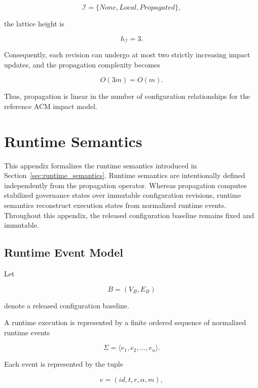 \documentclass[10pt]{article}
\begin{document}
\[
\mathcal I
=
\{
None,
Local,
Propagated
\},
\]

the lattice height is

\[
h_{\mathcal I}=3.
\]

Consequently, each revision can undergo at most two strictly increasing impact
updates, and the propagation complexity becomes

\begin{equation}
	\label{eq:worklist_complexity_acm}
	O(3m)
	=
	O(m).
\end{equation}

Thus, propagation is linear in the number of configuration relationships for
the reference ACM impact model.

\section{Runtime Semantics}
\label{appendix:runtime_semantics}

This appendix formalizes the runtime semantics introduced in
Section~\ref{sec:runtime_semantics}. Runtime semantics are intentionally
defined independently from the propagation operator. Whereas propagation
computes stabilized governance states over immutable configuration revisions,
runtime semantics reconstruct execution states from normalized runtime events.
Throughout this appendix, the released configuration baseline remains fixed and
immutable.

\subsection{Runtime Event Model}
\label{appendix:runtime_event_model}

Let

\[
B=(V_B,E_B)
\]

denote a released configuration baseline.

A runtime execution is represented by a finite ordered sequence of normalized
runtime events

\begin{equation}
\Sigma
=
\langle
e_1,e_2,\ldots,e_n
\rangle.
\end{equation}

Each event is represented by the tuple

\begin{equation}
e
=
(
id,
t,
r,
\alpha,
m
),
\end{equation}
\end{document}
